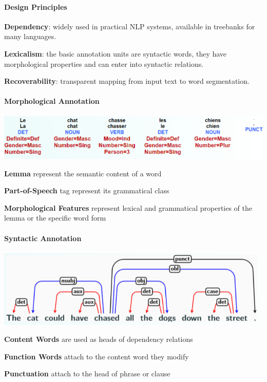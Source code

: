 \documentclass[10pt]{report}
\begin{document}
\paragraph{Design Principles}\begin{list}{}{}
	\item \textbf{Dependency}: widely used in practical NLP systems, available in treebanks for many languages.
	\item \textbf{Lexicalism}: the basic annotation units are syntactic words, they have morphological properties and can enter into syntactic relations.
	\item \textbf{Recoverability}: transparent mapping from input text to word segmentation.
\end{list}
\paragraph{Morphological Annotation} 
\begin{center}
	\includegraphics[scale=0.5]{49.png}
\end{center}
\begin{list}{}{}
	\item \textbf{Lemma} represent the semantic content of a word
	\item \textbf{Part-of-Speech} tag represent its grammatical class
	\item \textbf{Morphological Features} represent lexical and grammatical properties of the lemma or the specific word form
\end{list}
\paragraph{Syntactic Annotation}
\begin{center}
	\includegraphics[scale=0.5]{50.png}
\end{center}
\begin{list}{}{}
	\item \textbf{Content Words} are used as heads of dependency relations
	\item \textbf{Function Words} attach to the content word they modify
	\item \textbf{Punctuation} attach to the head of phrase or clause
\end{list}
\end{document}
